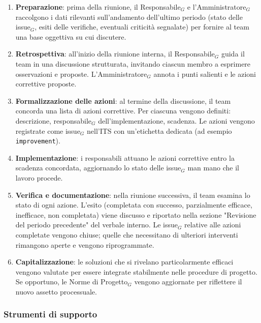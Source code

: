 \documentclass[a4paper, 10pt]{article}
\begin{document}
\begin{enumerate}
    \item \textbf{Preparazione}: prima della riunione, il Responsabile$_G$ e l'Amministratore$_G$ raccolgono i dati rilevanti sull'andamento dell'ultimo periodo (stato delle issue$_G$, esiti delle verifiche, eventuali criticità segnalate) per fornire al team una base oggettiva su cui discutere.
    
    \item \textbf{Retrospettiva}: all'inizio della riunione interna, il Responsabile$_G$ guida il team in una discussione strutturata, invitando ciascun membro a esprimere osservazioni e proposte. L'Amministratore$_G$ annota i punti salienti e le azioni correttive proposte.
    
    \item \textbf{Formalizzazione delle azioni}: al termine della discussione, il team concorda una lista di azioni correttive. Per ciascuna vengono definiti: descrizione, responsabile$_G$ dell'implementazione, scadenza. Le azioni vengono registrate come issue$_G$ nell'ITS con un'etichetta dedicata (ad esempio \texttt{improvement}).
    
    \item \textbf{Implementazione}: i responsabili attuano le azioni correttive entro la scadenza concordata, aggiornando lo stato delle issue$_G$ man mano che il lavoro procede.
    
    \item \textbf{Verifica e documentazione}: nella riunione successiva, il team esamina lo stato di ogni azione. L'esito (completata con successo, parzialmente efficace, inefficace, non completata) viene discusso e riportato nella sezione "Revisione del periodo precedente" del verbale interno. Le issue$_G$ relative alle azioni completate vengono chiuse; quelle che necessitano di ulteriori interventi rimangono aperte e vengono riprogrammate.
    
    \item \textbf{Capitalizzazione}: le soluzioni che si rivelano particolarmente efficaci vengono valutate per essere integrate stabilmente nelle procedure di progetto. Se opportuno, le Norme di Progetto$_G$ vengono aggiornate per riflettere il nuovo assetto processuale.
\end{enumerate}

\subsubsection{Strumenti di supporto}
\label{subsubsec:strumenti_miglioramento}
\end{document}
